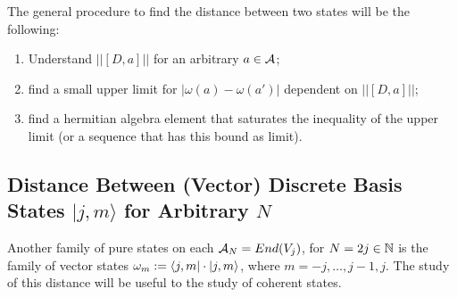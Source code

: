 The general procedure to find the distance between two states will be the following: 

    \begin{enumerate}
    
    \item Understand $||[D, a]||$ for an arbitrary $a \in \mathcal A$; 
    
    \item find a small upper limit for $|\omega(a) - \omega(a')|$ dependent on $||[D, a]||$;
    
    \item find a hermitian algebra element that saturates the inequality of the upper limit (or a sequence that has this bound as limit).
    
    \end{enumerate} 

\subsection{Distance Between (Vector) Discrete Basis States $|j,m\rangle$ for Arbitrary $N$}




Another family of pure states on each $\mathcal A_N = End(V_j)$, for $N = 2j \in \mathbb{N}$  is the family of vector states $\textcolor{black}{\omega_m} := \langle j, m | \cdot | j, m \rangle$, where $m = -j, \dots, j-1, j$. The study of this distance will be useful to the study of coherent states.

